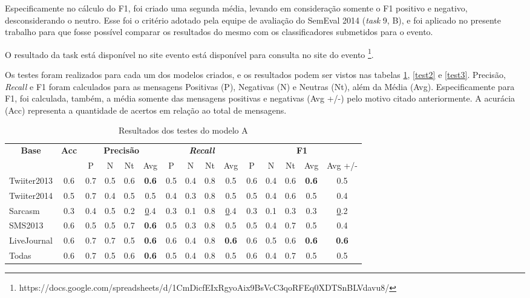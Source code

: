 \documentclass[12pt]{article}
\begin{document}
Especificamente no cálculo do F1, foi criado uma segunda média, levando em consideração somente o F1 positivo e negativo, desconsiderando o neutro. Esse foi o critério adotado pela equipe de avaliação do SemEval 2014 (\emph{task} 9, B), e foi aplicado no presente trabalho para que fosse possível comparar os resultados do mesmo com os classificadores submetidos para o evento.

O resultado da task está disponível no site evento está disponível para consulta no site do evento \footnote{https://docs.google.com/spreadsheets/d/1CmDicfEIxRgyoAix9BsVcC3qoRFEq0XDTSnBLVdavu8/}.

Os testes foram realizados para cada um dos modelos criados, e os resultados podem ser vistos nas tabelas \ref{test1}, \ref{test2} e \ref{test3}. Precisão, \emph{Recall} e F1 foram calculados para as mensagens Positivas (P), Negativas (N) e Neutras (Nt), além da Média (Avg). Especificamente para F1, foi calculada, também, a média somente das mensagens positivas e negativas (Avg +/-) pelo motivo citado anteriormente. A acurácia (Acc) representa a quantidade de acertos em relação ao total de mensagens.

\begin{table}[H]
\centering
\begin{adjustwidth}{-1cm}{}
\begin{tabular}{lcccccccccccccc}
\multicolumn{1}{c}{\textbf{Base}} & \textbf{Acc} & \multicolumn{4}{c}{\textbf{Precisão}} & \multicolumn{4}{c}{\textit{\textbf{Recall}}} & \multicolumn{5}{c}{\textbf{F1}} \\
 &  & \multicolumn{1}{c|}{P} & \multicolumn{1}{c|}{N} & \multicolumn{1}{c|}{Nt} & Avg & \multicolumn{1}{c|}{P} & \multicolumn{1}{c|}{N} & \multicolumn{1}{c|}{Nt} & Avg & \multicolumn{1}{c|}{P} & \multicolumn{1}{c|}{N} & \multicolumn{1}{c|}{Nt} & \multicolumn{1}{c|}{Avg} & Avg +/- \\
Twiiter2013 & 0.6 & 0.7 & 0.5 & 0.6 & \textbf{0.6} & 0.5 & 0.4 & 0.8 & 0.5 & 0.6 & 0.4 & 0.6 &  \textbf{0.6} & 0.5 \\ \hline
Twiiter2014 & 0.5 & 0.7 & 0.4 & 0.5 & 0.5 & 0.4 & 0.3 & 0.8 & 0.5 & 0.5 & 0.4 & 0.6 & 0.5 & 0.4 \\ \hline
Sarcasm & 0.3 & 0.4 & 0.5 & 0.2 & {\ul0.4} & 0.3 & 0.1 & 0.8 & {\ul0.4} & 0.3 & 0.1 & 0.3 & 0.3 & {\ul0.2} \\ \hline
SMS2013 & 0.6 & 0.5 & 0.5 & 0.7 & \textbf{0.6} & 0.5 & 0.3 & 0.8 & 0.5 & 0.5 & 0.4 & 0.7 & 0.5 & 0.4 \\ \hline
LiveJournal & 0.6 & 0.7 & 0.7 & 0.5 & \textbf{0.6} & 0.6 & 0.4 & 0.8 & \textbf{0.6} & 0.6 & 0.5 & 0.6 & \textbf{0.6} & \textbf{0.6} \\ \hline
Todas & 0.6 & 0.7 & 0.5 & 0.6 & \textbf{0.6} & 0.5 & 0.4 & 0.8 & 0.5 & 0.6 & 0.4 & 0.7 & 0.5 & 0.5 \\ \hline
\end{tabular}
\caption{Resultados dos testes do modelo A}
\label{test1}
\end{adjustwidth}
\end{table}
\end{document}
